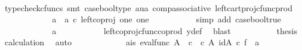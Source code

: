 \begin{isabellebody}
\ \ \ \ \ \ \ \ \ \isamarkupfalse%
\ {\isacharparenleft}{\kern0pt}typecheck{\isacharunderscore}{\kern0pt}cfuncs{\isacharcomma}{\kern0pt}\ smt\ case{\isacharunderscore}{\kern0pt}bool{\isacharunderscore}{\kern0pt}type\ aua\ comp{\isacharunderscore}{\kern0pt}associative{}\ left{\isacharunderscore}{\kern0pt}cart{\isacharunderscore}{\kern0pt}proj{\isacharunderscore}{\kern0pt}cfunc{\isacharunderscore}{\kern0pt}prod{\isacharparenright}{\kern0pt}\isanewline
\ \ \ \ \ \ \ \isamarkupfalse%
\ \isamarkupfalse%
\ {\isachardoublequoteopen}{\isachardot}{\kern0pt}{\isachardot}{\kern0pt}{\isachardot}{\kern0pt}\ {\isacharequal}{\kern0pt}\ {\isacharparenleft}{\kern0pt}a{}\ {\isasymamalg}\ a{}{\isacharparenright}{\kern0pt}\ {\isasymcirc}\isactrlsub c\ left{\isacharunderscore}{\kern0pt}coproj\ one\ one{\isachardoublequoteclose}\isanewline
\ \ \ \ \ \ \ \ \ \isamarkupfalse%
\ {\isacharparenleft}{\kern0pt}simp\ add{\isacharcolon}{\kern0pt}\ case{\isacharunderscore}{\kern0pt}bool{\isacharunderscore}{\kern0pt}true{\isacharparenright}{\kern0pt}\isanewline
\ \ \ \ \ \ \ \isamarkupfalse%
\ \isamarkupfalse%
\ {\isachardoublequoteopen}{\isachardot}{\kern0pt}{\isachardot}{\kern0pt}{\isachardot}{\kern0pt}\ {\isacharequal}{\kern0pt}\ a{}{\isachardoublequoteclose}\isanewline
\ \ \ \ \ \ \ \ \ \isamarkupfalse%
\ left{\isacharunderscore}{\kern0pt}coproj{\isacharunderscore}{\kern0pt}cfunc{\isacharunderscore}{\kern0pt}coprod\ y{\isacharunderscore}{\kern0pt}def\ \isamarkupfalse%
\ blast\isanewline
\ \ \ \ \ \ \ \isamarkupfalse%
\ \isamarkupfalse%
\ {\isacharquery}{\kern0pt}thesis\ \isamarkupfalse%
\ calculation\ \isamarkupfalse%
\ auto\isanewline
\ \ \ \ \ \isamarkupfalse%
\isanewline
\ \ \ \ \ \isamarkupfalse%
\ a{}{\isacharunderscore}{\kern0pt}is{\isacharcolon}{\kern0pt}\ {\isachardoublequoteopen}{\isacharparenleft}{\kern0pt}eval{\isacharunderscore}{\kern0pt}func\ A\ {\isasymOmega}\ {\isasymcirc}\isactrlsub c\ {\isasymlangle}{\isasymf}\ {\isasymcirc}\isactrlsub c\ {\isasymbeta}\isactrlbsub A\isactrlbsup {\isasymOmega}\isactrlesup \isactrlesub {\isacharcomma}{\kern0pt}\ id{\isacharparenleft}{\kern0pt}A\isactrlbsup {\isasymOmega}\isactrlesup {\isacharparenright}{\kern0pt}{\isasymrangle}{\isacharparenright}{\kern0pt}\ {\isasymcirc}\isactrlsub c\ f\ {\isacharequal}{\kern0pt}\ a{}{\isachardoublequoteclose}\isanewline

\end{isabellebody}
